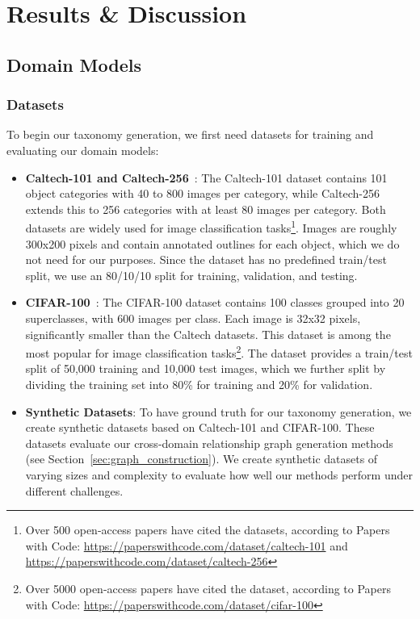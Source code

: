 \chapter{Results \& Discussion}

\section{Domain Models}

\subsection{Datasets}

To begin our taxonomy generation,
we first need datasets for training and evaluating our domain models:

\begin{itemize}
      \item \textbf{Caltech-101 and Caltech-256}~\cite{li_caltech_2022,griffin_caltech_2022}:
            The Caltech-101 dataset contains 101 object categories with 40 to 800 images per category,
            while Caltech-256 extends this to 256 categories with at least 80 images per category.
            Both datasets are widely used for image classification tasks\footnote{Over 500 open-access papers have cited the datasets, according to Papers with Code: \url{https://paperswithcode.com/dataset/caltech-101} and \url{https://paperswithcode.com/dataset/caltech-256}}.
            Images are roughly 300x200 pixels and contain annotated outlines
            for each object, which we do not need for our purposes.
            Since the dataset has no predefined train/test split,
            we use an 80/10/10 split for training, validation, and testing.
      \item \textbf{CIFAR-100}~\cite{krizhevsky_learning_2009}:
            The CIFAR-100 dataset contains 100 classes grouped into 20 superclasses,
            with 600 images per class.
            Each image is 32x32 pixels, significantly smaller than the Caltech datasets.
            This dataset is among the most popular for image classification tasks\footnote{Over 5000 open-access papers have cited the dataset, according to Papers with Code: \url{https://paperswithcode.com/dataset/cifar-100}}.
            The dataset provides a train/test split of 50,000 training and 10,000 test images,
            which we further split by dividing the training set into 80\% for training and 20\% for validation.
      \item \textbf{Synthetic Datasets}:
            To have ground truth for our taxonomy generation,
            we create synthetic datasets based on Caltech-101 and CIFAR-100.
            These datasets evaluate our cross-domain relationship graph generation
            methods (see Section~\ref{sec:graph_construction}).
            We create synthetic datasets of varying sizes and complexity to evaluate
            how well our methods perform under different challenges.
\end{itemize}

